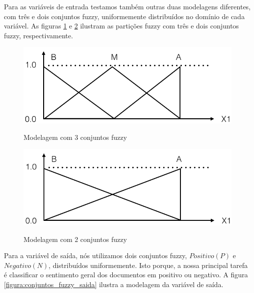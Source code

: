 \documentclass[template.tex]{subfiles}
\begin{document}
Para as variáveis de entrada testamos também outras duas modelagens diferentes, com três e dois conjuntos fuzzy, uniformemente distribuídos no domínio de cada variável. As figuras \ref{figura:tres_conjuntos_fuzzy} e \ref{figura:conjuntos_fuzzy_entrada_final} ilustram as partições fuzzy com três e dois conjuntos fuzzy, respectivamente.

\begin{figure}[H]
\caption{Modelagem com 3 conjuntos fuzzy}
\centering
\includegraphics[scale=0.45]{tres_conjuntos_fuzzy.png}
\label{figura:tres_conjuntos_fuzzy}
\end{figure}

\begin{figure}[H]
\caption{Modelagem com 2 conjuntos fuzzy}
\centering
\includegraphics[scale=0.45]{conjuntos_fuzzy_entrada_final.png}
\label{figura:conjuntos_fuzzy_entrada_final}
\end{figure}


Para a variável de saída, nós utilizamos dois conjuntos fuzzy, $Positivo (P)$ e $Negativo (N)$, distribuídos uniformemente. Isto porque, a nossa principal tarefa é classificar o sentimento geral dos documentos em positivo ou negativo. A figura \ref{figura:conjuntos_fuzzy_saida} ilustra a modelagem da variável de saída.
\end{document}
